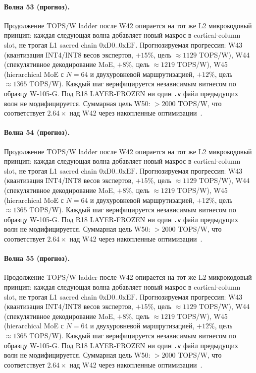 \paragraph{Волна 53 (прогноз).} Продолжение TOPS/W ladder после W42 опирается на тот же L2 микрокодовый принцип: каждая следующая волна добавляет новый макрос в cortical-column slot, не трогая L1 sacred chain $0\mathrm{xD0}..0\mathrm{xEF}$. Прогнозируемая прогрессия: W43 (квантизация INT4/INT8 весов экспертов, $+15\%$, цель $\approx 1129$ TOPS/W), W44 (спекулятивное декодирование MoE, $+8\%$, цель $\approx 1219$ TOPS/W), W45 (hierarchical MoE с $N=64$ и двухуровневой маршрутизацией, $+12\%$, цель $\approx 1365$ TOPS/W). Каждый шаг верифицируется независимым витнесом по образцу W-105-G. Под R18 LAYER-FROZEN ни один \texttt{.v} файл предыдущих волн не модифицируется. Суммарная цель W50: $> 2000$ TOPS/W, что соответствует $2{.}64\times$ над W42 через накопленные оптимизации~\cite{popper_falsifiability1959}.

\paragraph{Волна 54 (прогноз).} Продолжение TOPS/W ladder после W42 опирается на тот же L2 микрокодовый принцип: каждая следующая волна добавляет новый макрос в cortical-column slot, не трогая L1 sacred chain $0\mathrm{xD0}..0\mathrm{xEF}$. Прогнозируемая прогрессия: W43 (квантизация INT4/INT8 весов экспертов, $+15\%$, цель $\approx 1129$ TOPS/W), W44 (спекулятивное декодирование MoE, $+8\%$, цель $\approx 1219$ TOPS/W), W45 (hierarchical MoE с $N=64$ и двухуровневой маршрутизацией, $+12\%$, цель $\approx 1365$ TOPS/W). Каждый шаг верифицируется независимым витнесом по образцу W-105-G. Под R18 LAYER-FROZEN ни один \texttt{.v} файл предыдущих волн не модифицируется. Суммарная цель W50: $> 2000$ TOPS/W, что соответствует $2{.}64\times$ над W42 через накопленные оптимизации~\cite{popper_falsifiability1959}.

\paragraph{Волна 55 (прогноз).} Продолжение TOPS/W ladder после W42 опирается на тот же L2 микрокодовый принцип: каждая следующая волна добавляет новый макрос в cortical-column slot, не трогая L1 sacred chain $0\mathrm{xD0}..0\mathrm{xEF}$. Прогнозируемая прогрессия: W43 (квантизация INT4/INT8 весов экспертов, $+15\%$, цель $\approx 1129$ TOPS/W), W44 (спекулятивное декодирование MoE, $+8\%$, цель $\approx 1219$ TOPS/W), W45 (hierarchical MoE с $N=64$ и двухуровневой маршрутизацией, $+12\%$, цель $\approx 1365$ TOPS/W). Каждый шаг верифицируется независимым витнесом по образцу W-105-G. Под R18 LAYER-FROZEN ни один \texttt{.v} файл предыдущих волн не модифицируется. Суммарная цель W50: $> 2000$ TOPS/W, что соответствует $2{.}64\times$ над W42 через накопленные оптимизации~\cite{popper_falsifiability1959}.

